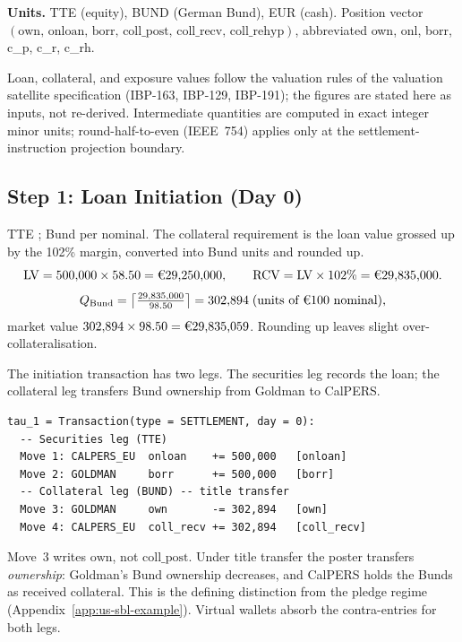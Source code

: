 \noindent\textbf{Units.} TTE (equity), BUND (German Bund), EUR (cash). Position vector $(\mathrm{own},\,\allowbreak\mathrm{onloan},\,\allowbreak\mathrm{borr},\,\allowbreak\mathrm{coll\_post},\,\allowbreak\mathrm{coll\_recv},\,\allowbreak\mathrm{coll\_rehyp})$, abbreviated own, onl, borr, c\_p, c\_r, c\_rh.

\begin{remark}
Loan, collateral, and exposure values follow the valuation rules of the valuation satellite specification (IBP-163, IBP-129, IBP-191); the figures are stated here as inputs, not re-derived. Intermediate quantities are computed in exact integer minor units; round-half-to-even (IEEE~754) applies only at the settlement-instruction projection boundary.
\end{remark}

\subsection{Step 1: Loan Initiation (Day 0)}
\label{sec:eu-step1}

TTE ; Bund  per  nominal. The collateral requirement is the loan value grossed up by the 102\% margin, converted into Bund units and rounded up.
\[
\mathrm{LV} = 500{,}000 \times 58.50 = \text{\EUR{29,250,000}}, \qquad
\mathrm{RCV} = \mathrm{LV} \times 102\% = \text{\EUR{29,835,000}}.
\]
\[
Q_{\mathrm{Bund}} = \left\lceil \tfrac{29{,}835{,}000}{98.50} \right\rceil = 302{,}894 \;\text{(units of \EUR{100} nominal)},
\]
market value $302{,}894 \times 98.50 = \text{\EUR{29,835,059}}$. Rounding up leaves slight over-collateralisation.

The initiation transaction has two legs. The securities leg records the loan; the collateral leg transfers Bund ownership from Goldman to CalPERS.

\begin{lstlisting}
tau_1 = Transaction(type = SETTLEMENT, day = 0):
  -- Securities leg (TTE)
  Move 1: CALPERS_EU  onloan    += 500,000   [onloan]
  Move 2: GOLDMAN     borr      += 500,000   [borr]
  -- Collateral leg (BUND) -- title transfer
  Move 3: GOLDMAN     own       -= 302,894   [own]
  Move 4: CALPERS_EU  coll_recv += 302,894   [coll_recv]
\end{lstlisting}

\noindent Move~3 writes $\mathrm{own}$, not $\mathrm{coll\_post}$. Under title transfer the poster transfers \emph{ownership}: Goldman's Bund ownership decreases, and CalPERS holds the Bunds as received collateral. This is the defining distinction from the pledge regime (Appendix~\ref{app:us-sbl-example}). Virtual wallets absorb the contra-entries for both legs.

